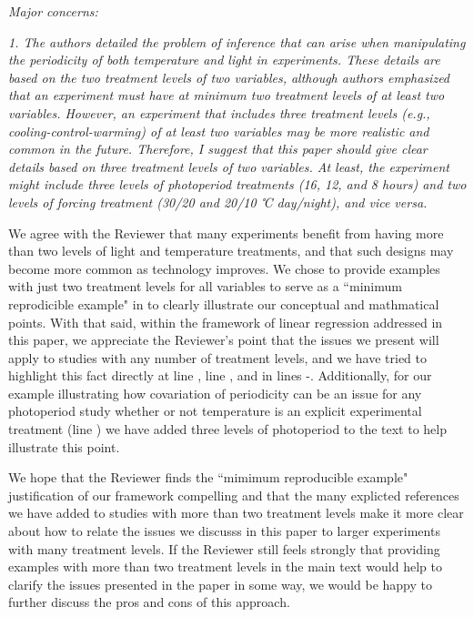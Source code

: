 \documentclass[11pt]{article}
\begin{document}
\emph{Major concerns:}

\emph{1. The authors detailed the problem of inference that can arise when manipulating the periodicity of both temperature and light in experiments. These details are based on the two treatment levels of two variables, although authors emphasized that an experiment must have at minimum two treatment levels of at least two variables. However, an experiment that includes three treatment levels (e.g., cooling-control-warming) of at least two variables may be more realistic and common in the future. Therefore, I suggest that this paper should give clear details based on three treatment levels of two variables. At least, the experiment might include three levels of photoperiod treatments (16, 12, and 8 hours) and two levels of forcing treatment (30/20 and 20/10 ℃ day/night), and vice versa.}

We agree with the Reviewer that many experiments benefit from having more than two levels of light and temperature treatments, and that such designs may become more common as technology improves. We chose to provide examples with just two treatment levels for all variables to serve as a ``minimum reprodicible example" in to clearly illustrate our conceptual and mathmatical points. With that said, within the framework of linear regression addressed in this paper, we appreciate the Reviewer's point that the issues we present will apply to studies with any number of treatment levels, and we have tried to highlight this fact directly at line , line , and in lines -. %
Additionally, for our example illustrating how covariation of periodicity can be an issue for any photoperiod study whether or not temperature is an explicit experimental treatment (line ) we have added three levels of photoperiod to the text to help illustrate this point.

We hope that the Reviewer finds the ``mimimum reproducible example" justification of our framework compelling and that the many explicted references we have added to studies with more than two treatment levels make it more clear about how to relate the issues we discusss in this paper to larger experiments with many treatment levels. If the Reviewer still feels strongly that providing examples with more than two treatment levels in the main text would help to clarify the issues presented in the paper in some way, we would be happy to further discuss the pros and cons of this approach.
\end{document}
